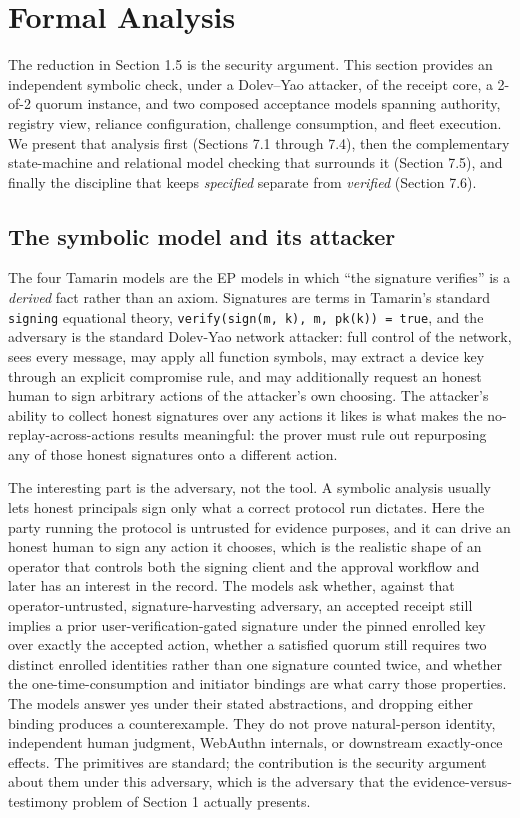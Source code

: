 \documentclass[11pt]{article}
\newcommand{\code}[1]{\texttt{#1}}
\begin{document}
\section{Formal Analysis}

The reduction in Section 1.5 is the security argument. This section provides an
independent symbolic check, under a Dolev--Yao attacker, of the receipt core, a
2-of-2 quorum instance, and two composed acceptance models spanning authority,
registry view, reliance configuration, challenge consumption, and fleet execution. We present that
analysis first (Sections 7.1 through 7.4), then the
complementary state-machine and relational model checking that surrounds it
(Section 7.5), and finally the discipline that keeps \emph{specified} separate from
\emph{verified} (Section 7.6).

\subsection{The symbolic model and its attacker}

The four Tamarin models are the EP models in which ``the signature verifies'' is a
\emph{derived} fact rather than an axiom. Signatures are terms in Tamarin's
standard \code{signing} equational theory, \code{verify(sign(m, k), m, pk(k)) =
true}, and the adversary is the standard Dolev-Yao network attacker: full control
of the network, sees every message, may apply all function symbols, may extract a
device key through an explicit compromise rule, and may additionally request an
honest human to sign arbitrary actions of the attacker's own choosing. The
attacker's ability to collect honest signatures over any actions it likes is what
makes the no-replay-across-actions results meaningful: the prover must rule out
repurposing any of those honest signatures onto a different action.

The interesting part is the adversary, not the tool. A symbolic analysis usually
lets honest principals sign only what a correct protocol run dictates. Here the
party running the protocol is untrusted for evidence purposes, and it can drive an
honest human to sign any action it chooses, which is the realistic shape of an
operator that controls both the signing client and the approval workflow and later
has an interest in the record. The models ask whether, against that
operator-untrusted, signature-harvesting adversary, an accepted receipt still
implies a prior user-verification-gated signature under the pinned enrolled key
over exactly the accepted action, whether a satisfied quorum still requires two
distinct enrolled identities rather than one signature counted twice, and whether
the one-time-consumption and initiator bindings are what carry those properties.
The models answer yes under their stated abstractions, and dropping either binding
produces a counterexample. They do not prove natural-person identity, independent
human judgment, WebAuthn internals, or downstream exactly-once effects. The
primitives are standard; the contribution is the security argument about them
under this adversary, which is the adversary that the evidence-versus-testimony
problem of Section 1 actually presents.
\end{document}
